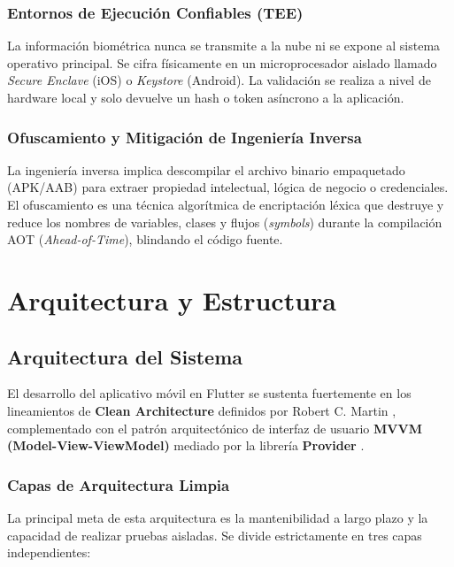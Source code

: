 \documentclass[12pt,letterpaper]{report}
\newcommand{\tech}[1]{\textbf{#1}}
\begin{document}
\subsection{Entornos de Ejecución Confiables (TEE)}
La información biométrica nunca se transmite a la nube ni se expone al sistema operativo principal. Se cifra físicamente en un microprocesador aislado llamado \textit{Secure Enclave} (iOS) o \textit{Keystore} (Android). La validación se realiza a nivel de hardware local y solo devuelve un hash o token asíncrono a la aplicación.

\subsection{Ofuscamiento y Mitigación de Ingeniería Inversa}
La ingeniería inversa implica descompilar el archivo binario empaquetado (APK/AAB) para extraer propiedad intelectual, lógica de negocio o credenciales. El ofuscamiento es una técnica algorítmica de encriptación léxica que destruye y reduce los nombres de variables, clases y flujos (\textit{symbols}) durante la compilación AOT (\textit{Ahead-of-Time}), blindando el código fuente.

\chapter{Arquitectura y Estructura}

\section{Arquitectura del Sistema}
El desarrollo del aplicativo móvil en Flutter se sustenta fuertemente en los lineamientos de \textbf{Clean Architecture} definidos por Robert C. Martin \cite{cleanArchitecture}, complementado con el patrón arquitectónico de interfaz de usuario \textbf{MVVM (Model-View-ViewModel)} mediado por la librería \tech{Provider} \cite{providerFlutter}.

\subsection{Capas de Arquitectura Limpia}
La principal meta de esta arquitectura es la mantenibilidad a largo plazo y la capacidad de realizar pruebas aisladas. Se divide estrictamente en tres capas independientes:
\end{document}
